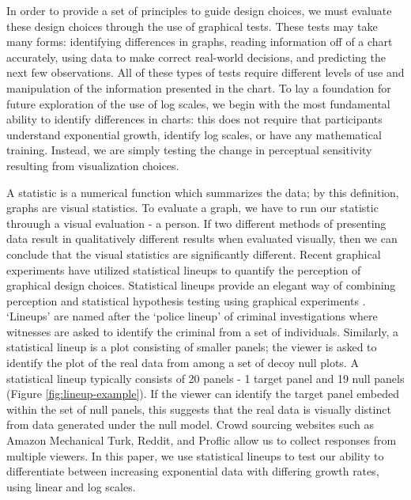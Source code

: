 \documentclass[]{interact}
\theoremstyle{plain}%
\theoremstyle{definition}
\theoremstyle{remark}
\begin{document}
In order to provide a set of principles to guide design choices, we must
evaluate these design choices through the use of graphical tests. These
tests may take many forms: identifying differences in graphs, reading
information off of a chart accurately, using data to make correct
real-world decisions, and predicting the next few observations. All of
these types of tests require different levels of use and manipulation of
the information presented in the chart. To lay a foundation for future
exploration of the use of log scales, we begin with the most fundamental
ability to identify differences in charts: this does not require that
participants understand exponential growth, identify log scales, or have
any mathematical training. Instead, we are simply testing the change in
perceptual sensitivity resulting from visualization choices.

A statistic is a numerical function which summarizes the data; by this
definition, graphs are visual statistics. To evaluate a graph, we have
to run our statistic throuugh a visual evaluation - a person. If two
different methods of presenting data result in qualitatively different
results when evaluated visually, then we can conclude that the visual
statistics are significantly different. Recent graphical experiments
have utilized statistical lineups to quantify the perception of
graphical design
choices\citep{vanderplas_clusters_2017, hofmann_graphical_2012, loyVariationsQQPlots2016}.
Statistical lineups provide an elegant way of combining perception and
statistical hypothesis testing using graphical experiments
\citep{wickham2010graphical, majumder_validation_2013, vanderplas_statistical_nodate}.
`Lineups' are named after the `police lineup' of criminal investigations
where witnesses are asked to identify the criminal from a set of
individuals. Similarly, a statistical lineup is a plot consisting of
smaller panels; the viewer is asked to identify the plot of the real
data from among a set of decoy null plots. A statistical lineup
typically consists of 20 panels - 1 target panel and 19 null panels
(Figure \ref{fig:lineup-example}). If the viewer can identify the target
panel embeded within the set of null panels, this suggests that the real
data is visually distinct from data generated under the null model.
Crowd sourcing websites such as Amazon Mechanical Turk, Reddit, and
Proflic allow us to collect responses from multiple viewers. In this
paper, we use statistical lineups to test our ability to differentiate
between increasing exponential data with differing growth rates, using
linear and log scales.
\end{document}
